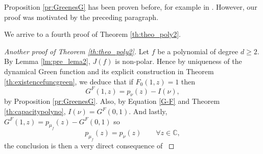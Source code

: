 \begin{myrmk}{}{}
Proposition \ref{pr:GreenesG} has been proven before, for example in \cite[Proposition 8.1]{hubbard}. However, our proof was motivated by the preceding paragraph.
\end{myrmk}

We arrive to a fourth proof of Theorem \ref{th:theo_poly2}.

\begin{proof}[Another proof of Theorem \ref{th:theo_poly2}]
Let $f$ be a polynomial of degree $d\geq 2$. By Lemma \ref{lm:pre_lema2}, $J(f)$ is non-polar. Hence by uniqueness of the dynamical Green function and its explicit construction in Theorem \ref{th:existencefuncgreen}, we deduce that if $F_0(1,z)=1$ then
$$G^F(1,z) = p_\nu(z)-I(\nu),$$
by Proposition \ref{pr:GreenesG}. Also, by Equation \eqref{G-F} and Theorem \ref{th:capacitypolyno}, $I(\nu)=G^F(0,1)$. And lastly, $G^F(1,z)=p_{\mu_f}(z)-G^F(0,1)$ so
$$p_{\mu_f}(z) = p_\nu(z) \qquad \forall z\in \mathbb{C},$$
the conclusion is then a very direct consequence of \cite[Theorem 3.4.7]{ransford} 
\end{proof} 